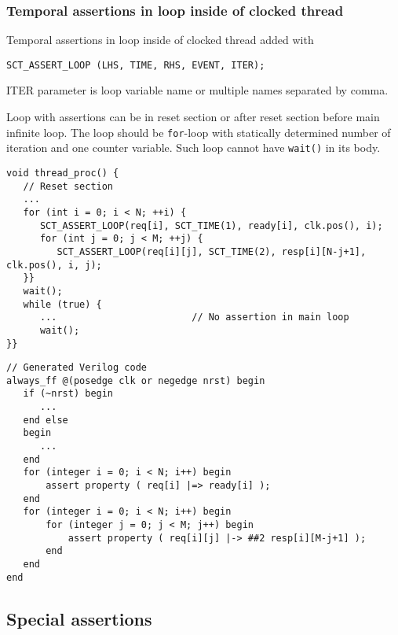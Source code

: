 \subsubsection{Temporal assertions in loop inside of clocked thread}

Temporal assertions in loop inside of clocked thread added with 
\begin{lstlisting}[style=mycpp]
SCT_ASSERT_LOOP (LHS, TIME, RHS, EVENT, ITER);
\end{lstlisting}
%
ITER parameter is loop variable name or multiple names separated by comma.

Loop with assertions can be in reset section or after reset section before main infinite loop. The loop should be {\tt for}-loop with statically determined number of iteration and one counter variable. Such loop cannot have {\tt wait()} in its body. 

\begin{lstlisting}[style=mycpp]
void thread_proc() {
   // Reset section
   ...
   for (int i = 0; i < N; ++i) {
      SCT_ASSERT_LOOP(req[i], SCT_TIME(1), ready[i], clk.pos(), i);
      for (int j = 0; j < M; ++j) {
         SCT_ASSERT_LOOP(req[i][j], SCT_TIME(2), resp[i][N-j+1], clk.pos(), i, j);
   }}
   wait();                        
   while (true) { 
      ...                        // No assertion in main loop 
      wait();
}}
\end{lstlisting}
%
\begin{lstlisting}[style=myverilog]
// Generated Verilog code
always_ff @(posedge clk or negedge nrst) begin
   if (~nrst) begin
      ...
   end else 
   begin 
      ... 
   end 
   for (integer i = 0; i < N; i++) begin
       assert property ( req[i] |=> ready[i] );  
   end 
   for (integer i = 0; i < N; i++) begin
       for (integer j = 0; j < M; j++) begin
           assert property ( req[i][j] |-> ##2 resp[i][M-j+1] );  
       end
   end 
end
\end{lstlisting}

\subsection{Special assertions}\label{section:assert_special}

